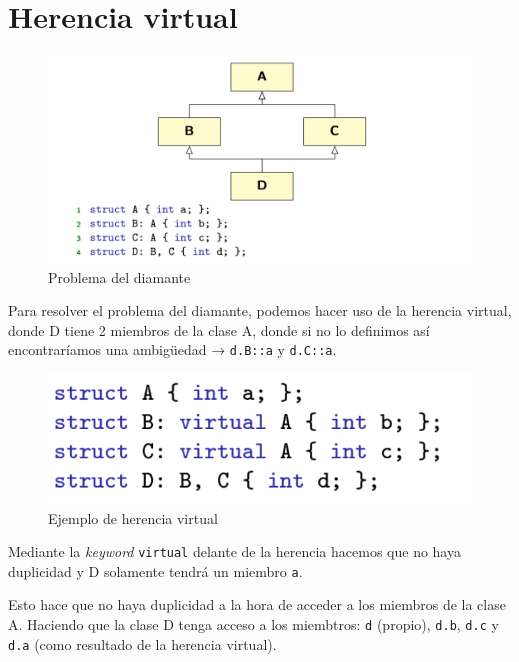 \newpage

\section{Herencia virtual}
\begin{center}
	\begin{figure}[h]
	\includegraphics[width=\textwidth]{Imagenes/gen9.png}
	\caption{Problema del diamante}
\end{figure}
\end{center}
Para resolver el problema del diamante, podemos hacer uso de la herencia virtual, donde D tiene 2 miembros de la clase A, donde si no lo definimos así encontraríamos una ambigüedad → \texttt{d.B::a} y \texttt{d.C::a}.  
\begin{center}
	\begin{figure}[h]
	\includegraphics[width=\textwidth]{Imagenes/gen10.png}
	\caption{Ejemplo de herencia virtual}
\end{figure}
\end{center}
Mediante la \textit{keyword} \texttt{virtual} delante de la herencia hacemos que no haya duplicidad y D solamente tendrá un miembro \texttt{a}.

Esto hace que no haya duplicidad a la hora de acceder a los miembros de la clase A. Haciendo que la clase D tenga acceso a los miembtros: \texttt{d} (propio), \texttt{d.b}, \texttt{d.c} y \texttt{d.a} (como resultado de la herencia virtual).

